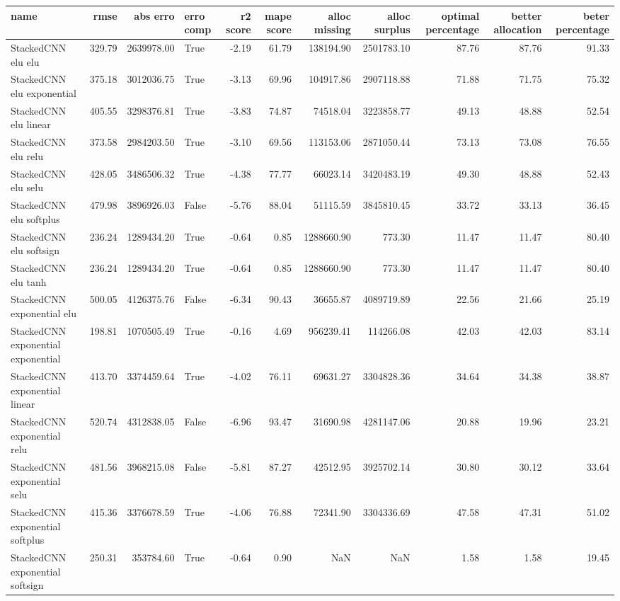 \begin{tabular}{lrrlrrrrrrr}
\toprule
name & rmse & abs erro & erro comp & r2 score & mape score & alloc missing & alloc surplus & optimal percentage & better allocation & beter percentage \\
\midrule
StackedCNN elu elu & 329.79 & 2639978.00 & True & -2.19 & 61.79 & 138194.90 & 2501783.10 & 87.76 & 87.76 & 91.33 \\
StackedCNN elu exponential & 375.18 & 3012036.75 & True & -3.13 & 69.96 & 104917.86 & 2907118.88 & 71.88 & 71.75 & 75.32 \\
StackedCNN elu linear & 405.55 & 3298376.81 & True & -3.83 & 74.87 & 74518.04 & 3223858.77 & 49.13 & 48.88 & 52.54 \\
StackedCNN elu relu & 373.58 & 2984203.50 & True & -3.10 & 69.56 & 113153.06 & 2871050.44 & 73.13 & 73.08 & 76.55 \\
StackedCNN elu selu & 428.05 & 3486506.32 & True & -4.38 & 77.77 & 66023.14 & 3420483.19 & 49.30 & 48.88 & 52.43 \\
StackedCNN elu softplus & 479.98 & 3896926.03 & False & -5.76 & 88.04 & 51115.59 & 3845810.45 & 33.72 & 33.13 & 36.45 \\
StackedCNN elu softsign & 236.24 & 1289434.20 & True & -0.64 & 0.85 & 1288660.90 & 773.30 & 11.47 & 11.47 & 80.40 \\
StackedCNN elu tanh & 236.24 & 1289434.20 & True & -0.64 & 0.85 & 1288660.90 & 773.30 & 11.47 & 11.47 & 80.40 \\
StackedCNN exponential elu & 500.05 & 4126375.76 & False & -6.34 & 90.43 & 36655.87 & 4089719.89 & 22.56 & 21.66 & 25.19 \\
StackedCNN exponential exponential & 198.81 & 1070505.49 & True & -0.16 & 4.69 & 956239.41 & 114266.08 & 42.03 & 42.03 & 83.14 \\
StackedCNN exponential linear & 413.70 & 3374459.64 & True & -4.02 & 76.11 & 69631.27 & 3304828.36 & 34.64 & 34.38 & 38.87 \\
StackedCNN exponential relu & 520.74 & 4312838.05 & False & -6.96 & 93.47 & 31690.98 & 4281147.06 & 20.88 & 19.96 & 23.21 \\
StackedCNN exponential selu & 481.56 & 3968215.08 & False & -5.81 & 87.27 & 42512.95 & 3925702.14 & 30.80 & 30.12 & 33.64 \\
StackedCNN exponential softplus & 415.36 & 3376678.59 & True & -4.06 & 76.88 & 72341.90 & 3304336.69 & 47.58 & 47.31 & 51.02 \\
StackedCNN exponential softsign & 250.31 & 353784.60 & True & -0.64 & 0.90 & NaN & NaN & 1.58 & 1.58 & 19.45 \\

\end{tabular}
